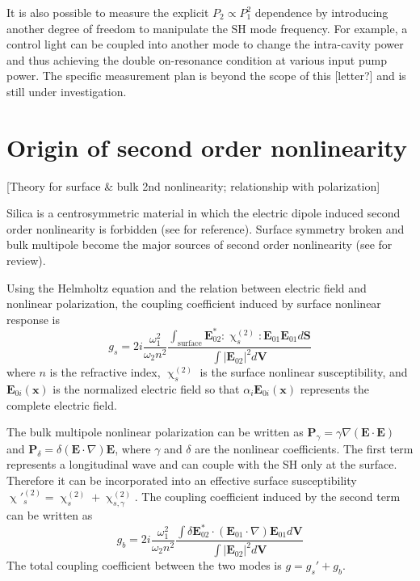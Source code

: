 \documentclass[a4paper,12pt,hyperref]{article}
\begin{document}
It is also possible to measure the explicit $P_2 \propto P_1^2$ dependence by introducing another degree of freedom to manipulate the SH mode frequency. For example, a control light can be coupled into another mode to change the intra-cavity power and thus achieving the double on-resonance condition at various input pump power. The specific measurement plan is beyond the scope of this [letter?] and is still under investigation.


\section{Origin of second order nonlinearity}
[Theory for surface \& bulk 2nd nonlinearity; relationship with polarization]

Silica is a centrosymmetric material in which the electric dipole induced second order nonlinearity is forbidden (see \cite{boyd2003nonlinear} for reference). Surface symmetry broken and bulk multipole become the major sources of second order nonlinearity (see \cite{heinz1991second} for review). 

Using the Helmholtz equation and the relation between electric field and nonlinear polarization, the coupling coefficient induced by surface nonlinear response is
\begin{equation}
g_s = 2i\frac{\omega_1^2}{\omega_2n^2}\frac{\int_{\mathrm{surface} } \mathbf{E}_{02}^*:\upchi^{(2)}_s:\mathbf{E}_{01}\mathbf{E}_{01} d\mathbf{S}}{\int |\mathbf{E}_{02}|^2 d\mathbf{V}}
\end{equation}
where $n$ is the refractive index, $\upchi^{(2)}_s$ is the surface nonlinear susceptibility, and $\mathbf{E}_{0i}(\mathbf{x})$ is the  normalized electric field so that $\alpha_i\mathbf{E}_{0i}(\mathbf{x})$ represents the complete electric field. 

The bulk multipole nonlinear polarization can be written as $\mathbf{P}_\gamma =  \gamma\nabla(\mathbf{E}\cdot\mathbf{E})$ and $\mathbf{P}_\delta =  \delta(\mathbf{E}\cdot\nabla)\mathbf{E}$, where $\gamma$ and $\delta$ are the nonlinear coefficients. The first term represents a longitudinal wave and can couple with the SH only at the surface. Therefore it can be incorporated into an effective surface susceptibility $\upchi'^{(2)}_s = \upchi^{(2)}_s+\upchi^{(2)}_{s,\gamma}$\cite{heinz1991second}. The coupling coefficient induced by the second term can be written as %
\begin{equation}
g_b =  2i\frac{\omega_1^2}{\omega_2n^2}\frac{\int \delta\mathbf{E}_{02}^* \cdot (\mathbf{E}_{01}\cdot\nabla)\mathbf{E}_{01} d\mathbf{V}}{\int |\mathbf{E}_{02}|^2 d\mathbf{V}}
\label{eq:gb}
\end{equation}
The total coupling coefficient between the two modes is $g = g_s'+g_b$. 
\end{document}
